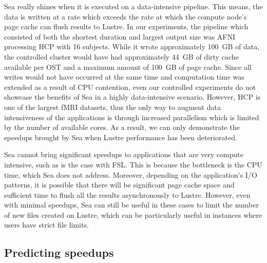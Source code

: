     Sea really shines when it is executed on a data-intensive pipeline. This
    means, the data is written at a rate which exceeds the rate at which the
    compute node's page cache can flush results to Lustre. In our experiments,
    the pipeline which consisted of both the shortest duration and largest
    output size was AFNI processing HCP with 16 subjects. While it wrote
    approximately 100~GB of data, the controlled cluster would have had
    approximately 44~GB of dirty cache available per OST and a maximum amount of
    100~GB of page cache. Since all writes would not have occurred at the same
    time and computation time was extended as a result of CPU contention, even
    our controlled experiments do not showcase the benefits of Sea in a highly
    data-intensive scenario. However, HCP is one of the largest fMRI datasets,
    thus the only way to augment data intensiveness of the applications is
    through increased parallelism which is limited by the number of available
    cores. As a result, we can only demonstrate the speedups brought by Sea when
    Lustre performance has been deteriorated.


    Sea cannot bring significant speedups to applications that are very compute intensive,
    such as is the case with FSL. This is because the bottleneck is the CPU time, which Sea
    does not address. Moreover, depending on the application's I/O patterns, it is possible
    that there will be significant page cache space and sufficient time to flush all the
    results asynchronously to Lustre. However, even with minimal speedups, Sea can still be
    useful in these cases to limit the number of new files created on Lustre, which can be particularly
    useful in instances where users have strict file limits.


    \subsection{Predicting speedups}

